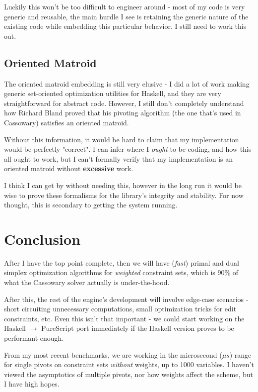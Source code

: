 \documentclass{article}
\begin{document}
Luckily this won't be too difficult to engineer around - most of my code
is very generic and reusable, the main hurdle I see is retaining the generic
nature of the existing code while embedding this particular behavior. I still
need to work this out.

\subsection*{Oriented Matroid}

The oriented matroid embedding is still very elusive - I did a lot of work
making generic set-oriented optimization utilities for Haskell, and they
are very straightforward for abstract code. However, I still don't completely
understand how Richard Bland proved that his pivoting algorithm (the one that's
used in Cassowary) satisfies an oriented matroid.

Without this information, it would be hard to claim that my implementation would
be perfectly "correct". I can infer where I \textit{ought} to be coding, and
how this all ought to work, but I can't formally verify that my implementation
is an oriented matroid without \textbf{excessive} work.

I think I can get by without needing this, however in the long run it would
be wise to prove these formalisms for the library's integrity and stability.
For now thought, this is secondary to getting the system running.

\section*{Conclusion}

After I have the top point complete, then we will have (\textit{fast}) primal and dual
simplex optimization algorithms for \textit{weighted} constraint sets, which is 90\%
of what the Cassowary solver actually is under-the-hood.

After this, the rest of the engine's development will involve edge-case scenarios -
short circuiting unnecessary computations, small optimization tricks for edit constraints,
etc. Even this isn't that important - we could start working on the Haskell $\rightarrow$
PureScript port immediately if the Haskell version proves to be performant enough.

From my most recent benchmarks, we are working in the microsecond ($\mu s$) range
for single pivots on constraint sets \textit{without} weights, up to 1000 variables.
I haven't viewed the asymptotics of multiple pivots, nor how weights affect the scheme,
but I have high hopes.
\end{document}
